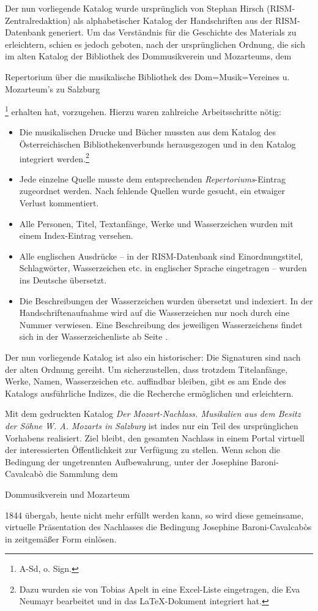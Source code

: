 Der nun vorliegende Katalog wurde ursprünglich von Stephan Hirsch (RISM-Zentralredaktion) als alphabetischer Katalog der Handschriften aus der RISM-Datenbank generiert. Um das Verständnis für die Geschichte des Materials zu erleichtern, schien es jedoch geboten, nach der ursprünglichen Ordnung, die sich im alten Katalog der Bibliothek des Dommusikverein und Mozarteums, dem \begin{itshape}Repertorium über die musikalische Bibliothek des Dom=Musik=Vereines u. Mozarteum’s zu Salzburg\end{itshape}\footnote{A-Sd, o. Sign.} erhalten hat, vorzugehen. Hierzu waren zahlreiche Arbeitsschritte nötig:
\begin{itemize}
	\item Die musikalischen Drucke und Bücher mussten aus dem Katalog des Österreichischen Bibliothekenverbunds herausgezogen und in den Katalog integriert werden.\footnote{Dazu wurden sie von Tobias Apelt in eine Excel-Liste eingetragen, die Eva Neumayr bearbeitet und in das LaTeX-Dokument integriert hat.}
	\item Jede einzelne Quelle musste dem entsprechenden \textit{Repertoriums}-Eintrag zugeordnet werden. Nach fehlende Quellen wurde gesucht, ein etwaiger Verlust kommentiert.
	\item Alle Personen, Titel, Textanfänge, Werke und Wasserzeichen wurden mit einem Index-Eintrag versehen.
	\item Alle englischen Ausdrücke -- in der RISM-Datenbank sind Einordnungstitel, Schlagwörter, Wasserzeichen etc. in englischer Sprache eingetragen --  wurden ins Deutsche übersetzt.
	\item Die Beschreibungen der Wasserzeichen wurden übersetzt und indexiert. In der Handschriftenaufnahme wird auf die Wasserzeichen nur noch durch eine Nummer verwiesen. Eine Beschreibung des jeweiligen Wasserzeichens findet sich in der Wasserzeichenliste ab Seite \pageref{Wz}. 
	\end{itemize} 
Der nun vorliegende Katalog ist also ein historischer: Die Signaturen sind nach der alten Ordnung gereiht. Um sicherzustellen, dass trotzdem Titelanfänge, Werke, Namen, Wasserzeichen etc. auffindbar bleiben, gibt es am Ende des Katalogs ausführliche Indizes, die die Recherche ermöglichen und erleichtern.

Mit dem gedruckten Katalog \textit{Der \glqq Mozart-Nachlass\grqq{}. Musikalien aus dem Besitz der Söhne W. A. Mozarts in Salzburg} ist indes nur ein Teil des ursprünglichen Vorhabens realisiert. Ziel bleibt, den gesamten Nachlass in einem Portal virtuell der interessierten Öffentlichkeit zur Verfügung zu stellen. Wenn schon die Bedingung der \glqq ungetrennten Aufbewahrung\grqq{}, unter der Josephine Baroni-Cavalcabò die Sammlung dem \begin{itshape}Dommusikverein und Mozarteum\end{itshape} 1844 übergab, heute nicht mehr erfüllt werden kann, so wird diese gemeinsame, virtuelle Präsentation des Nachlasses die Bedingung Josephine Baroni-Cavalcabòs in zeitgemäßer Form einlösen.

